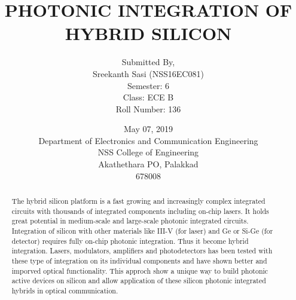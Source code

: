 \documentclass[12pt,a4paper]{report}
\begin{document}
\title{PHOTONIC INTEGRATION OF HYBRID SILICON}
\author{Submitted By,\\Sreekanth Sasi (NSS16EC081) \\
Semester: 6 \\ Class: ECE B \\ Roll Number: 136 }       
\date{May 07, 2019\\
 Department of Electronics and Communication Engineering\\
 NSS College of Engineering\\
 Akathethara PO, Palakkad\\
 678008}  
\maketitle


\begin{abstract}
  The hybrid silicon platform is a fast growing and increasingly complex integrated circuits with thousands of integrated components including on-chip lasers. It holds great potential in medium-scale and large-scale photonic integrated circuits. Integration of silicon with other materials like III-V (for laser) and Ge or Si-Ge (for detector) requires fully on-chip photonic integration. Thus it become hybrid integration. Lasers, modulators, amplifiers and photodetectors has been tested with these type of integration on its individual components and have shown better and imporved optical functionality. This approch show a unique way to build photonic active devices on silicon and allow application of these silicon photonic integrated hybrids in optical communication.
\end{abstract}

\tableofcontents
\end{document}
